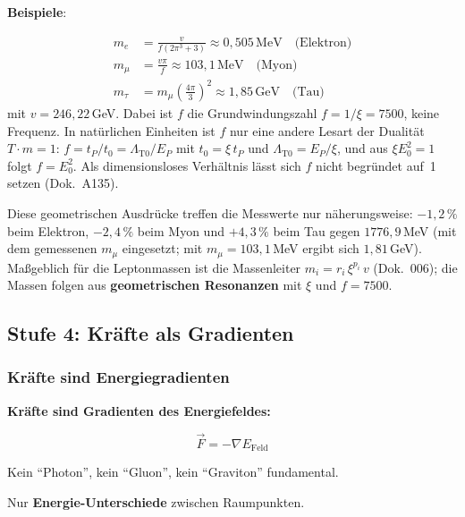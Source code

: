 	\textbf{Beispiele}:

	\begin{align}
		m_e &= \frac{v}{f(2\pi^3 + 3)} \approx 0{,}505\,\text{MeV} \quad \text{(Elektron)} \\
		m_\mu &= \frac{v\pi}{f} \approx 103{,}1\,\text{MeV} \quad \text{(Myon)} \\
		m_\tau &= m_\mu \left(\frac{4\pi}{3}\right)^2 \approx 1{,}85\,\text{GeV} \quad \text{(Tau)}
	\end{align}
	mit $v = 246{,}22$\,GeV. Dabei ist $f$ die Grundwindungszahl $f = 1/\xi = 7500$, keine Frequenz. In natürlichen Einheiten ist $f$ nur eine andere Lesart der Dualität $T\cdot m = 1$: $f = t_P/t_0 = \Lambda_{\text{T0}}/E_P$ mit $t_0 = \xi\,t_P$ und $\Lambda_{\text{T0}} = E_P/\xi$, und aus $\xi E_0^2 = 1$ folgt $f = E_0^2$. Als dimensionsloses Verhältnis lässt sich $f$ nicht begründet auf~1 setzen (Dok.~A135).

	Diese geometrischen Ausdrücke treffen die Messwerte nur näherungsweise: $-1{,}2\,\%$ beim Elektron, $-2{,}4\,\%$ beim Myon und $+4{,}3\,\%$ beim Tau gegen $1776{,}9$\,MeV (mit dem gemessenen $m_\mu$ eingesetzt; mit $m_\mu = 103{,}1$\,MeV ergibt sich $1{,}81$\,GeV). Maßgeblich für die Leptonmassen ist die Massenleiter $m_i = r_i\,\xi^{p_i}\,v$ (Dok.~006); die Massen folgen aus \textbf{geometrischen Resonanzen} mit $\xi$ und $f = 7500$.

	\subsection{Stufe 4: Kräfte als Gradienten}

	\subsubsection{Kräfte sind Energiegradienten}

	\begin{keyresult}
		\textbf{Kräfte sind Gradienten des Energiefeldes:}

		\begin{equation}
			\boxed{\vec{F} = -\nabla E_{\text{Feld}}}
		\end{equation}

		\vspace{0.3cm}

		Kein \enquote{Photon}, kein \enquote{Gluon}, kein \enquote{Graviton} fundamental.

		Nur \textbf{Energie-Unterschiede} zwischen Raumpunkten.
	\end{keyresult}

